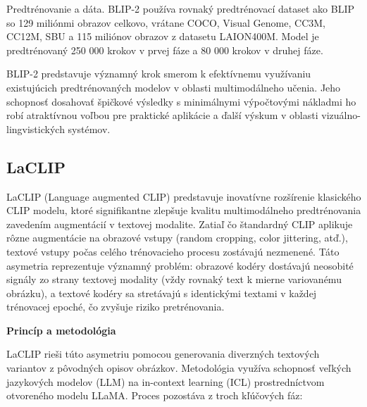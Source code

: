 \documentclass[]{tukediphc}
\begin{document}
Predtrénovanie a dáta. BLIP-2 používa rovnaký predtrénovací dataset ako BLIP so 129 miliónmi obrazov celkovo, vrátane COCO, Visual Genome, CC3M, CC12M, SBU a 115 miliónov obrazov z datasetu LAION400M. Model je predtrénovaný 250 000 krokov v prvej fáze a 80 000 krokov v druhej fáze\cite{BLIP2}.

BLIP-2 predstavuje významný krok smerom k efektívnemu využívaniu existujúcich predtrénovaných modelov v oblasti multimodálneho učenia. Jeho schopnosť dosahovať špičkové výsledky s minimálnymi výpočtovými nákladmi ho robí atraktívnou voľbou pre praktické aplikácie a ďalší výskum v oblasti vizuálno-lingvistických systémov.


\subsection{LaCLIP}

LaCLIP (Language augmented CLIP) predstavuje inovatívne rozšírenie klasického CLIP modelu, ktoré signifikantne zlepšuje kvalitu multimodálneho predtrénovania zavedením augmentácií v textovej modalite. Zatiaľ čo štandardný CLIP aplikuje rôzne augmentácie na obrazové vstupy (random cropping, color jittering, atď.), textové vstupy počas celého trénovacieho procesu zostávajú nezmenené. Táto asymetria reprezentuje významný problém: obrazové kodéry dostávajú neosobité signály zo strany textovej modality (vždy rovnaký text k mierne variovanému obrázku), a textové kodéry sa stretávajú s identickými textami v každej trénovacej epoché, čo zvyšuje riziko pretrénovania.

\textbf{Princíp a metodológia}

LaCLIP rieši túto asymetriu pomocou generovania diverzných textových variantov z pôvodných opisov obrázkov. Metodológia využíva schopnosť veľkých jazykových modelov (LLM) na in-context learning (ICL) prostredníctvom otvoreného modelu LLaMA\cite{LaCLIP}. Proces pozostáva z troch kľúčových fáz:
\end{document}
